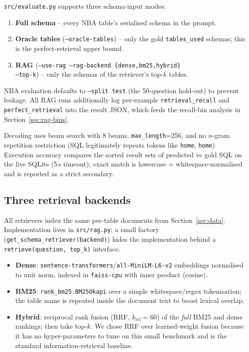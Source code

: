 \documentclass[11pt,a4paper]{article}
\begin{document}
\texttt{src/evaluate.py} supports three schema-input modes:
\begin{enumerate}[leftmargin=*,itemsep=2pt]
\item \textbf{Full schema} -- every NBA table's serialised schema in the prompt.
\item \textbf{Oracle tables} (\texttt{--oracle-tables}) -- only the gold
      \texttt{tables\_used} schemas; this is the perfect-retrieval upper
      bound.
\item \textbf{RAG} (\texttt{--use-rag --rag-backend \{dense,bm25,hybrid\}\\
      --top-k}) -- only the schemas of the retriever's top-$k$ tables.
\end{enumerate}
NBA evaluation defaults to \texttt{--split test} (the 50-question hold-out)
to prevent leakage. All RAG runs additionally log per-example
\texttt{retrieval\_recall} and \texttt{perfect\_retrieval} into the result
JSON, which feeds the recall-bin analysis in
Section~\ref{sec:rag-bins}.

Decoding uses beam search with $8$ beams, \texttt{max\_length}=256, and no
$n$-gram repetition restriction (SQL legitimately repeats tokens like
\texttt{home}, \texttt{home}). Execution accuracy compares the sorted result
sets of predicted vs gold SQL on the live SQLite (5\,s timeout); exact match
is lowercase + whitespace-normalised and is reported as a strict secondary.

\subsection{Three retrieval backends}
\label{sec:methods-retrieval}

All retrievers index the same per-table documents from
Section~\ref{sec:data}. Implementation lives in \texttt{src/rag.py}; a small
factory (\texttt{get\_schema\_retriever(backend)}) hides the implementation
behind a \texttt{retrieve(question, top\_k)} interface.

\begin{itemize}[leftmargin=*,itemsep=2pt]
  \item \textbf{Dense}: \texttt{sentence-transformers}/\texttt{all-MiniLM-L6-v2}
        embeddings normalised to unit norm, indexed in \texttt{faiss-cpu}
        with inner product (cosine).
  \item \textbf{BM25}: \texttt{rank\_bm25.BM25Okapi} over a simple
        whitespace/regex tokenisation; the table name is repeated inside the
        document text to boost lexical overlap.
  \item \textbf{Hybrid}: reciprocal rank fusion (RRF, $k_{\text{rrf}}=60$) of
        the \emph{full} BM25 and dense rankings; then take top-$k$. We chose
        RRF over learned-weight fusion because it has no hyper-parameters to
        tune on this small benchmark and is the standard
        information-retrieval baseline.
\end{itemize}
\end{document}
